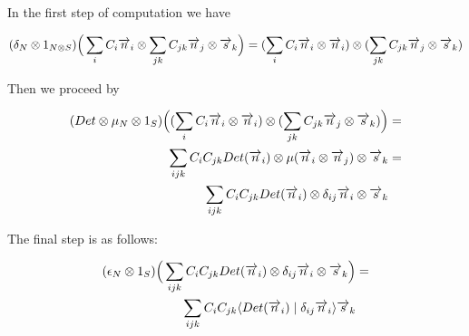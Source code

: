 In the first step of computation we have

\begin{align*}
(\delta_N \otimes 1_{N \otimes S})\Big(\sum_i C_i \overrightarrow{n}_i \otimes \sum_{jk} C_{jk} \overrightarrow{n}_j \otimes \overrightarrow{s}_k\Big) = 
(\sum_i C_i \overrightarrow{n}_i \otimes \overrightarrow{n}_i) \otimes  (\sum_{jk} C_{jk} \overrightarrow{n}_j \otimes \overrightarrow{s}_k)
\end{align*}

\noindent
Then we proceed by

\begin{align*}
(Det \otimes  \mu_N \otimes 1_S)\Big((\sum_i C_i \overrightarrow{n}_i \otimes \overrightarrow{n}_i) \otimes  (\sum_{jk} C_{jk} \overrightarrow{n}_j \otimes \overrightarrow{s}_k)\Big) &= \\
\sum_{ijk} C_i C_{jk} Det(\overrightarrow{n}_i) \otimes \mu(\overrightarrow{n}_i \otimes \overrightarrow{n}_j) \otimes \overrightarrow{s}_k &=\\
\sum_{ijk} C_i C_{jk} Det(\overrightarrow{n}_i) \otimes \delta_{ij} \overrightarrow{n}_i \otimes \overrightarrow{s}_k&
\end{align*}

\noindent
The final step is as follows:

\begin{align*}
(\epsilon_{N} \otimes 1_S)  \Big(\sum_{ijk} C_i C_{jk} Det(\overrightarrow{n}_i) \otimes \delta_{ij} \overrightarrow{n}_i \otimes \overrightarrow{s}_k \Big) &=   \\
\sum_{ijk} C_i C_{jk} \langle Det(\overrightarrow{n}_i) \mid \delta_{ij} \overrightarrow{n}_i \rangle \overrightarrow{s}_k
\end{align*}


